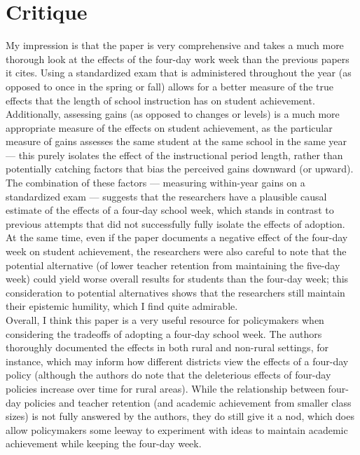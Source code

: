 \documentclass[10pt]{extarticle}
\begin{document}
  \section{Critique}%
  My impression is that the paper is very comprehensive and takes a much more thorough look at the effects of the four-day work week than the previous papers it cites. Using a standardized exam that is administered throughout the year (as opposed to once in the spring or fall) allows for a better measure of the true effects that the length of school instruction has on student achievement. Additionally, assessing gains (as opposed to changes or levels) is a much more appropriate measure of the effects on student achievement, as the particular measure of gains assesses the same student at the same school in the same year --- this purely isolates the effect of the instructional period length, rather than potentially catching factors that bias the perceived gains downward (or upward). The combination of these factors --- measuring within-year gains on a standardized exam --- suggests that the researchers have a plausible causal estimate of the effects of a four-day school week, which stands in contrast to previous attempts that did not successfully fully isolate the effects of adoption. At the same time, even if the paper documents a negative effect of the four-day week on student achievement, the researchers were also careful to note that the potential alternative (of lower teacher retention from maintaining the five-day week) could yield worse overall results for students than the four-day week; this consideration to potential alternatives shows that the researchers still maintain their epistemic humility, which I find quite admirable.\\

  Overall, I think this paper is a very useful resource for policymakers when considering the tradeoffs of adopting a four-day school week. The authors thoroughly documented the effects in both rural and non-rural settings, for instance, which may inform how different districts view the effects of a four-day policy (although the authors do note that the deleterious effects of four-day policies increase over time for rural areas). While the relationship between four-day policies and teacher retention (and academic achievement from smaller class sizes) is not fully answered by the authors, they do still give it a nod, which does allow policymakers some leeway to experiment with ideas to maintain academic achievement while keeping the four-day week.\\
\end{document}
